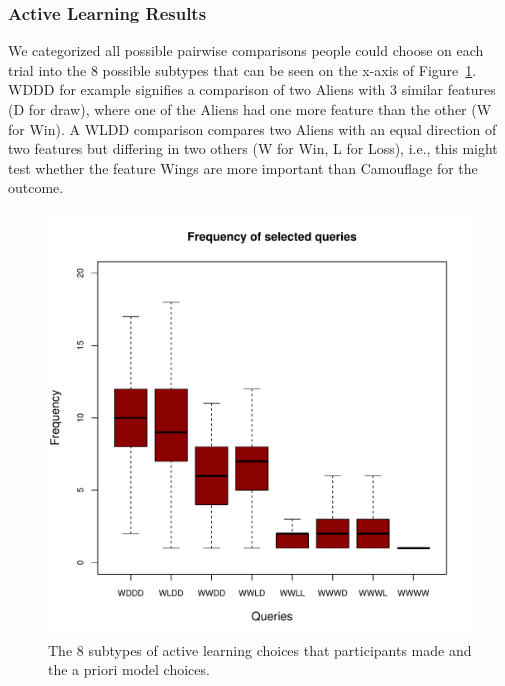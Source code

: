 \documentclass[10pt,letterpaper]{article}
\begin{document}
\subsubsection*{Active Learning Results}
We categorized all possible pairwise comparisons people could choose on each trial into the 8 possible subtypes that can be seen on the x-axis of Figure~\ref{shortoverview}. WDDD for example signifies a comparison of two Aliens with 3 similar features (D for draw), where one of the Aliens had one more feature than the other (W for Win). A WLDD comparison compares two Aliens with an equal direction of two features but differing in two others (W for Win, L for Loss), i.e., this might test whether the feature Wings are more important than Camouflage for the outcome.
\begin{figure}[htb!]
\includegraphics[scale=0.53]{shortoverview.pdf}
\caption{The 8 subtypes of active learning choices that participants made and the a priori model choices.}
\label{shortoverview}
\end{figure}
\end{document}
